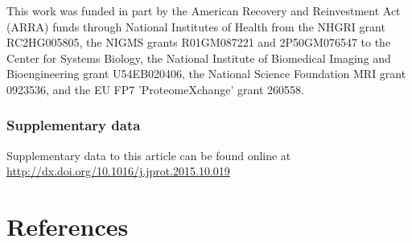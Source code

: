This work was funded in part by the American Recovery and Reinvestment Act (ARRA) 
funds through National Institutes of Health from the NHGRI grant RC2HG005805, the NIGMS
grants R01GM087221 and 2P50GM076547 to the Center for Systems Biology, the National 
Institute of Biomedical Imaging and Bioengineering grant U54EB020406, the National Science
Foundation MRI grant 0923536, and the EU FP7 'ProteomeXchange' grant 260558.

\subsubsection*{Supplementary data}
Supplementary data to this article can be found online at \newline
\href{http://dx.
doi.org/10.1016/j.jprot.2015.10.019}{http://dx.doi.org/10.1016/j.jprot.2015.10.019}


\section*{References}

